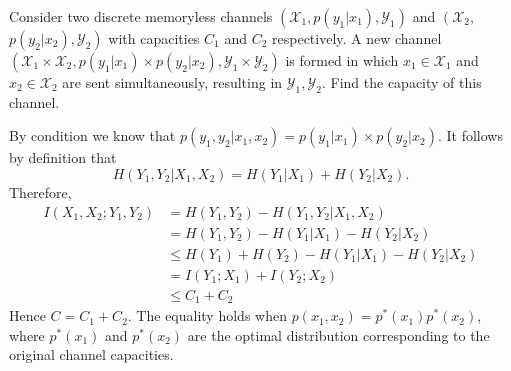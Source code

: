 \begin{exercise}{Consider two discrete memoryless channels $\left(\mathcal{X}_{1}, p\left(y_{1} | x_{1}\right), \mathcal{Y}_{1}\right)$ and $\left(\mathcal{X}_{2}, \right.$  $\left. p\left(y_{2} | x_{2}\right), \mathcal{Y}_{2}\right)$ with capacities $C_{1}$ and $C_{2}$ respectively. A new channel $\left(\mathcal{X}_{1} \times \mathcal{X}_{2}, p\left(y_{1} | x_{1}\right) \times p\left(y_{2} | x_{2}\right), \mathcal{Y}_{1} \times \mathcal{Y}_{2}\right)$ is formed in which $x_{1} \in \mathcal{X}_{1}$ and $x_{2} \in \mathcal{X}_{2}$ are sent simultaneously, resulting in $\mathcal{Y}_{1}, \mathcal{Y}_{2} .$ Find the capacity of this channel.}
  \begin{solution} By condition we know that $p(y_1,y_2|x_1,x_2) = p\left(y_{1} | x_{1}\right) \times p\left(y_{2} | x_{2}\right)$. It follows by definition that 
    \begin{equation}
      H(Y_1,Y_2|X_1,X_2) = H(Y_1|X_1)+H(Y_2|X_2).
    \end{equation}
    Therefore, 
    \begin{equation}
      \begin{aligned}
        I(X_1,X_2;Y_1,Y_2) &= H(Y_1,Y_2) - H(Y_1,Y_2|X_1,X_2) \\
        &= H(Y_1,Y_2) - H(Y_1|X_1) - H(Y_2|X_2) \\
        &\le H(Y_1) + H(Y_2) - H(Y_1|X_1) - H(Y_2|X_2) \\
        &= I(Y_1;X_1) + I(Y_2;X_2) \\
        &\le C_1 + C_2
      \end{aligned}
    \end{equation}
    Hence $C = C_1 +C_2$. The equality holds when $p(x_1,x_2) = p^{*}(x_1) p^{*}(x_2)$, where $p^{*}(x_1)$ and $p^{*}(x_2)$ are the optimal distribution corresponding to the original channel capacities.
  \end{solution}
  \label{ex3}
\end{exercise}

